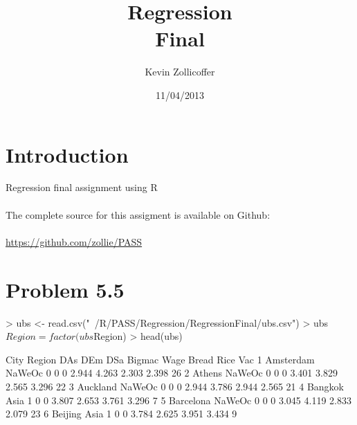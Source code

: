 \documentclass{article}
\author{Kevin Zollicoffer}
\title{Regression\\Final}
\date{11/04/2013}
\begin{document}
\maketitle


\section*{Introduction}
Regression final assignment using R
\\
\\
The complete source for this assigment is available on Github:
\\
\\
\url{https://github.com/zollie/PASS}

\section*{Problem 5.5}
\begin{Schunk}
\begin{Sinput}
> ubs <- read.csv("~/R/PASS/Regression/RegressionFinal/ubs.csv")
> ubs$Region = factor(ubs$Region)
> head(ubs)
\end{Sinput}
\begin{Soutput}
       City Region DAs DEm DSa Bigmac  Wage Bread  Rice Vac
1 Amsterdam NaWeOc   0   0   0  2.944 4.263 2.303 2.398  26
2    Athens NaWeOc   0   0   0  3.401 3.829 2.565 3.296  22
3  Auckland NaWeOc   0   0   0  2.944 3.786 2.944 2.565  21
4   Bangkok   Asia   1   0   0  3.807 2.653 3.761 3.296   7
5 Barcelona NaWeOc   0   0   0  3.045 4.119 2.833 2.079  23
6   Beijing   Asia   1   0   0  3.784 2.625 3.951 3.434   9
\end{Soutput}
\end{Schunk}
\end{document}
